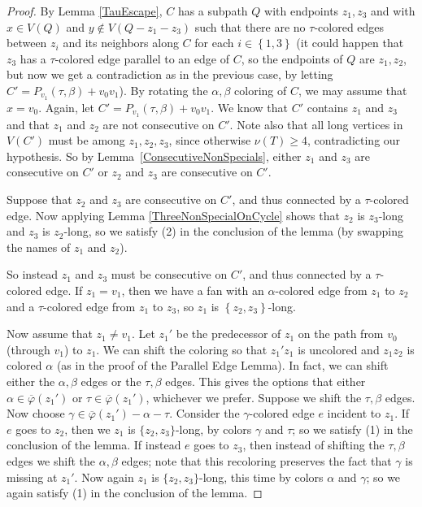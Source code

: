 \documentclass[12pt]{amsart}
\theoremstyle{plain}
\theoremstyle{definition}
\theoremstyle{remark}
\newcommand{\set}[1]{\left\{ #1 \right\}}
\newcommand{\vphn}{\overline{\varphi}}
\begin{document}
\begin{proof}
By Lemma \ref{TauEscape}, $C$ has a subpath $Q$ 
with endpoints $z_1,z_3$ and with $x \in V(Q)$ and $y \not
\in V(Q-z_1-z_3)$ 
such that there are no $\tau$-colored edges
between $z_i$ and its neighbors along $C$ for each $i \in \set{1,3}$ (it could
happen that $z_3$ has a $\tau$-colored edge parallel to an edge of $C$,
so the endpoints of $Q$ are $z_1, z_2$, but now we get a contradiction
as in the previous case, by letting $C'=P_{v_1}(\tau,\beta)+v_0v_1$).  By
rotating the $\alpha,\beta$ coloring of $C$, we
may assume that $x = v_0$.  Again, let $C' = P_{v_1}(\tau, \beta) + v_0v_1$.  We
know that $C'$ contains $z_1$ and $z_3$ and that $z_1$ and $z_2$ are not
consecutive on $C'$.  Note also that all long vertices in $V(C')$ must be among
$z_1,z_2,z_3$, since otherwise $\nu(T)\ge 4$, contradicting our hypothesis.
So by Lemma~\ref{ConsecutiveNonSpecials}, either $z_1$ and
$z_3$ are consecutive on $C'$ or $z_2$ and $z_3$ are consecutive on $C'$.

Suppose that $z_2$ and $z_3$ are consecutive on $C'$, and thus connected by a
$\tau$-colored edge.  Now applying Lemma \ref{ThreeNonSpecialOnCycle} shows that $z_2$
is $z_3$-long and $z_3$ is $z_2$-long, so we satisfy (2) in the conclusion of
the lemma (by swapping the names of $z_1$ and $z_2$).

So instead $z_1$ and $z_3$ must be consecutive on $C'$, and thus connected by a
$\tau$-colored edge.  If $z_1 = v_1$, then we have a fan with an
$\alpha$-colored edge from $z_1$ to $z_2$ and a $\tau$-colored edge from $z_1$
to $z_3$, so $z_1$ is $\set{z_2,z_3}$-long. 

Now assume that $z_1\ne v_1$.
Let $z_1'$ be the predecessor of $z_1$ on the path from $v_0$ (through $v_1$) to
$z_1$.  We can shift the coloring so that $z_1'z_1$ is uncolored and $z_1z_2$
is colored $\alpha$ (as in the proof of the Parallel Edge Lemma).  In fact, 
we can shift either the $\alpha,\beta$ edges or the $\tau,\beta$ edges.  This
gives the options that either $\alpha\in \vphn(z_1')$ or $\tau\in \vphn(z_1')$,
whichever we prefer.  Suppose we shift the $\tau,\beta$ edges.
Now choose $\gamma\in \vphn(z_1')-\alpha-\tau$.  Consider
the $\gamma$-colored edge $e$ incident to $z_1$.  If $e$ goes to $z_2$, then we
$z_1$ is $\{z_2,z_3\}$-long, by colors $\gamma$ and $\tau$; so we satisfy (1) in
the conclusion of the lemma.
If instead $e$ goes to $z_3$, then instead of shifting the $\tau,\beta$ edges we
shift the $\alpha,\beta$ edges; note that this recoloring preserves the fact
that $\gamma$ is missing at $z_1'$.  Now again $z_1$ is $\{z_2,z_3\}$-long, this
time by colors $\alpha$ and $\gamma$; so we again satisfy (1) in the conclusion
of the lemma.


\end{proof}
\end{document}
